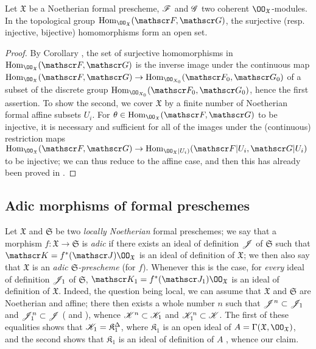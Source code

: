 \begin{prop}[10.11.9]
\label{1.10.11.9}
Let $\mathfrak{X}$ be a Noetherian formal prescheme, $\mathscr{F}$ and $\mathscr{G}$ two coherent $\OO_\mathfrak{X}$-modules.
In the topological group $\Hom_{\OO_\mathfrak{X}}(\sh{F},\sh{G})$, the surjective (resp. injective, bijective) homomorphisms form an open set.
\end{prop}

\begin{proof}
\label{proof-1.10.11.9}
By Corollary , the set of surjective homomorphisms in $\Hom_{\OO_\mathfrak{X}}(\sh{F},\sh{G})$ is the inverse image under the continuous map $\Hom_{\OO_\mathfrak{X}}(\sh{F},\sh{G})\to\Hom_{\OO_{X_0}}(\sh{F}_0,\sh{G}_0)$ of a subset of the discrete group $\Hom_{\OO_{X_0}}(\sh{F}_0,\sh{G}_0)$, hence the first assertion.
To show the second, we cover $\mathfrak{X}$ by a finite number of Noetherian formal affine subsets $U_i$.
For $\theta\in\Hom_{\OO_\mathfrak{X}}(\sh{F},\sh{G})$ to be injective, it is necessary and sufficient for all of the images under the (continuous) restriction maps $\Hom_{\OO_\mathfrak{X}}(\sh{F},\sh{G})\to\Hom_{\OO_\mathfrak{X}|U_i)}(\sh{F}|U_i,\sh{G}|U_i)$ to be injective; we can thus reduce to the affine case, and then this has already been proved in .
\end{proof}

\subsection{Adic morphisms of formal preschemes}
\label{subsection:1.10.12}

\begin{env}[10.12.1]
\label{1.10.12.1}
Let $\mathfrak{X}$ and $\mathfrak{S}$ be two \emph{locally Noetherian} formal preschemes;
we say that a morphism $f:\mathfrak{X}\to\mathfrak{S}$ is \emph{adic} if there exists an ideal of definition $\mathscr{J}$ of $\mathfrak{S}$ such that $\sh{K}=f^*(\sh{J})\OO_\mathfrak{X}$ is an ideal of definition of $\mathfrak{X}$;
we then also say that $\mathfrak{X}$ is an \emph{adic $\mathfrak{S}$-prescheme} (for $f$).
Whenever this is the case, for \emph{every} ideal of definition $\mathscr{J}_1$ of $\mathfrak{S}$, $\sh{K}_1=f^*(\sh{J}_1)\OO_\mathfrak{X}$ is an ideal of definition of $\mathfrak{X}$.
Indeed, the question being local, we can assume that $\mathfrak{X}$ and $\mathfrak{S}$ are Noetherian and affine;
there then exists a whole number $n$ such that $\mathscr{J}^n\subset\mathscr{J}_1$ and $\mathscr{J}_1^n\subset\mathscr{J}$ ( and ), whence $\mathscr{K}^n\subset\mathscr{K}_1$ and $\mathscr{K}_1^n\subset\mathscr{K}$.
The first of these equalities shows that $\mathscr{K}_1=\mathfrak{K}_1^\Delta$, where $\mathfrak{K}_1$ is an open ideal of $A=\Gamma(\mathfrak{X},\OO_\mathfrak{X})$, and the second shows that $\mathfrak{K}_1$ is an ideal of definition of $A$ , whence our claim.
\end{env}

